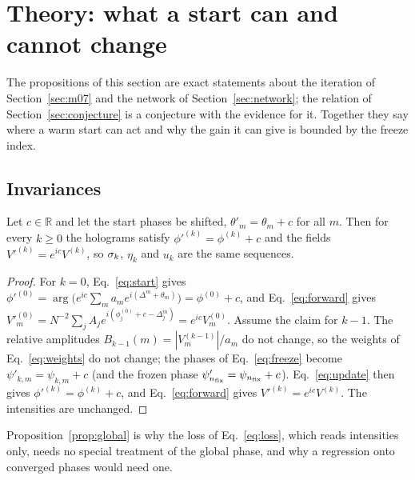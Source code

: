 \section{Theory: what a start can and cannot change}\label{sec:theory}

The propositions of this section are exact statements about the iteration of Section~\ref{sec:m07} and the network of Section~\ref{sec:network}; the relation of Section~\ref{sec:conjecture} is a conjecture with the evidence for it. Together they say where a warm start can act and why the gain it can give is bounded by the freeze index.

\subsection{Invariances}\label{sec:invariance}

\begin{proposition}\label{prop:global}
Let $c\in\mathbb R$ and let the start phases be shifted, $\theta'_m=\theta_m+c$ for all $m$. Then for every $k\ge0$ the holograms satisfy $\phi'^{(k)}=\phi^{(k)}+c$ and the fields $V'^{(k)}=e^{ic}V^{(k)}$, so $\sigma_k$, $\eta_k$ and $u_k$ are the same sequences.
\end{proposition}
\begin{proof}
For $k=0$, Eq.~\eqref{eq:start} gives $\phi'^{(0)}=\arg\big(e^{ic}\sum_ma_me^{i(\Delta^m+\theta_m)}\big)=\phi^{(0)}+c$, and Eq.~\eqref{eq:forward} gives $V'^{(0)}_m=N^{-2}\sum_jA_je^{i(\phi^{(0)}_j+c-\Delta_j^m)}=e^{ic}V^{(0)}_m$. Assume the claim for $k-1$. The relative amplitudes $B_{k-1}(m)=|V^{(k-1)}_m|/a_m$ do not change, so the weights of Eq.~\eqref{eq:weights} do not change; the phases of Eq.~\eqref{eq:freeze} become $\psi'_{k,m}=\psi_{k,m}+c$ (and the frozen
phase $\psi'_{n_{\mathrm{fix}}}=\psi_{n_{\mathrm{fix}}}+c$). Eq.~\eqref{eq:update} then gives $\phi'^{(k)}=\phi^{(k)}+c$, and Eq.~\eqref{eq:forward} gives $V'^{(k)}=e^{ic}V^{(k)}$. The intensities are unchanged. \end{proof}

Proposition~\ref{prop:global} is why the loss of Eq.~\eqref{eq:loss}, which reads intensities only, needs no special treatment of the global phase, and why a regression onto converged phases would need one.

